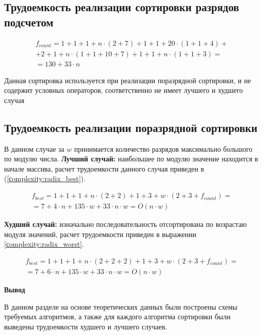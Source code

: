 \subsection{Трудоемкость реализации сортировки разрядов подсчетом}

\begin{equation}
	\label{сomplexity:count_best_worst}
	\begin{gathered}
		f_{count} = 1 + 1 + 1 + n \cdot (2 + 7)	 + 1 + 1 + 20 \cdot (1 + 1 + 4) + \\
		+ 2 + 1 + n \cdot (1 + 1 + 10 + 7) + 1 + 1 + n \cdot(1 +1 + 3) = \\
		= 130 + 33 \cdot n
	\end{gathered}
\end{equation}

Данная сортировка используется при реализации поразрядной сортировки, и не содержит условных операторов, соответственно не имеет лучшего и худшего случая


\subsection{Трудоемкость реализации поразрядной сортировки}
В данном случае за $w$ принимается количество разрядов максимально большого по модулю числа.
\textbf{Лучший случай:} наибольшее по модулю значение находится в начале массива, расчет трудоемкости данного случая приведен в (\ref{сomplexity:radix_best}).


\begin{equation}
	\label{сomplexity:radix_best}
	\begin{gathered}
		f_{best} = 1 + 1 + 1 + n \cdot (2 + 2) + 1 +3 + w \cdot (2 + 3 + f_{count}) = \\
		= 7 + 4 \cdot n + 135 \cdot w + 33 \cdot n \cdot w = O(n \cdot w)
	\end{gathered}
\end{equation}


\textbf{Худший случай:} изначально последовательность отсортирована по возрастаю модуля значений, расчет трудоемкости приведен в выражении \ref{сomplexity:radix_worst}.

\begin{equation}
	\label{сomplexity:radix_worst}
	\begin{gathered}
		f_{best} = 1 + 1 + 1 + n \cdot (2 + 2 + 2) + 1 +3 + w \cdot (2 + 3 + f_{count}) = \\
		= 7 + 6 \cdot n + 135 \cdot w + 33 \cdot n \cdot w = O(n \cdot w)
	\end{gathered}
\end{equation}




\textbf{Вывод}

В данном разделе на основе теоретических данных были построены схемы
требуемых алгоритмов, а также для каждого алгоритма сортировки были выведены трудоемкости худшего и лучшего случаев.









